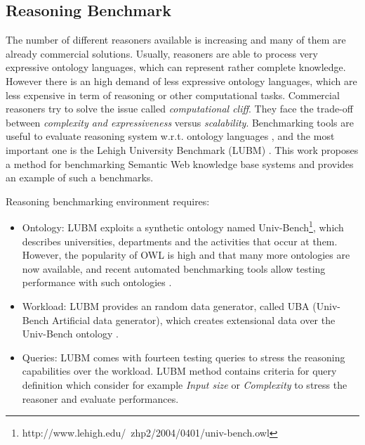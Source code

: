 \subsection{Reasoning Benchmark}\label{sec:lubm}

The number of different reasoners available is increasing and many of them are already commercial solutions. Usually, reasoners are able to process very expressive ontology languages, which can represent rather complete knowledge. However there is an high demand of less expressive ontology languages, which are less expensive in term of reasoning or other computational tasks. Commercial reasoners try to solve the issue called \textit{computational cliff}. They face the trade-off between \textit{complexity and expressiveness} versus \textit{scalability}. Benchmarking tools are useful to evaluate reasoning system w.r.t. ontology languages \cite{bock2008benchmarking}, and the most important one is the Lehigh University Benchmark  (LUBM) \cite{Guo2005}. This work proposes a  method for benchmarking Semantic Web knowledge base systems and provides an example of such a benchmarks.

Reasoning benchmarking environment requires:
\begin{itemize}
\item Ontology: LUBM exploits a synthetic ontology named Univ-Bench\footnote{http://www.lehigh.edu/~zhp2/2004/0401/univ-bench.owl}, which describes universities, departments and the activities that occur at them. However, the popularity of OWL is high and that
many more ontologies are now available, and recent automated benchmarking tools allow testing performance with such ontologies \cite{gardiner2006automated}.

\item Workload: LUBM provides an random data generator, called UBA (Univ-Bench Artificial data generator), which creates extensional data over the Univ-Bench ontology \cite{Guo2005}.

\item Queries: LUBM comes with fourteen testing queries to stress the reasoning capabilities over the workload. LUBM method contains criteria for query definition which consider for example \textit{Input size} or \textit{Complexity} to stress the reasoner and evaluate performances.
\end{itemize}

